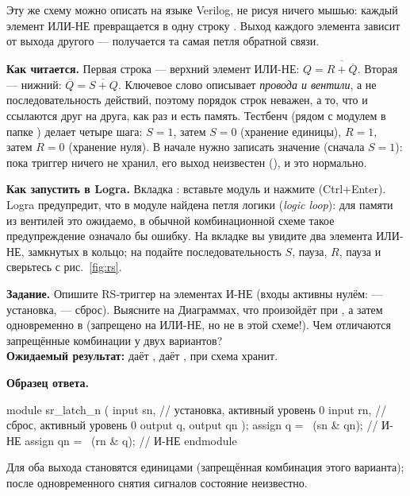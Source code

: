 Эту же схему можно описать на языке Verilog, не рисуя ничего мышью: каждый
элемент ИЛИ-НЕ превращается в одну строку . Выход каждого
элемента зависит от выхода другого --- получается та самая петля обратной
связи.


\textbf{Как читается.} Первая строка  --- верхний элемент ИЛИ-НЕ:
$Q=\overline{R+\overline{Q}}$. Вторая --- нижний:
$\overline{Q}=\overline{S+Q}$. Ключевое слово  описывает
\emph{провода и вентили}, а не последовательность действий, поэтому порядок
строк неважен, а то, что  и  ссылаются друг на друга, как раз
и есть память. Тестбенч  (рядом с модулем в папке
) делает четыре шага: $S=1$, затем $S=0$ (хранение
единицы), $R=1$, затем $R=0$ (хранение нуля). В начале нужно записать значение
(сначала $S=1$): пока триггер ничего не хранил, его выход неизвестен
(), и это нормально.

\textbf{Как запустить в Logra.} Вкладка : вставьте модуль и нажмите
 (Ctrl+Enter). Logra предупредит, что в модуле найдена
петля логики (\emph{logic loop}): для памяти из вентилей это ожидаемо, в
обычной комбинационной схеме такое предупреждение означало бы ошибку. На вкладке
 вы увидите два элемента ИЛИ-НЕ, замкнутых в кольцо; на
 подайте последовательность $S$, пауза, $R$, пауза и сверьтесь
с рис.~\ref{fig:rs}.

\begin{diybox}
\textbf{Задание.}  Опишите RS-триггер на элементах И-НЕ (входы
активны нулём:  --- установка,  --- сброс). 
Выясните на Диаграммах, что произойдёт при , а затем
одновременно в  (запрещено на ИЛИ-НЕ, но не в этой схеме!). Чем
отличаются запрещённые комбинации у двух вариантов?\\
\textbf{Ожидаемый результат:}  даёт ,  даёт
, при  схема хранит.
\end{diybox}

\textbf{Образец ответа.}
\begin{vcode}
module sr_latch_n (
    input  sn,       // установка, активный уровень 0
    input  rn,       // сброс, активный уровень 0
    output q,
    output qn
);
    assign q  = ~(sn & qn);   // И-НЕ
    assign qn = ~(rn & q);    // И-НЕ
endmodule
\end{vcode}
Для  оба выхода становятся единицами (запрещённая
комбинация этого варианта); после одновременного снятия сигналов состояние
неизвестно.

